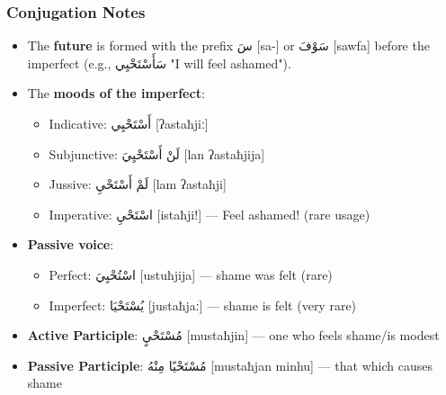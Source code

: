 \documentclass[letterpaper,12pt]{article}
\begin{document}
\subsubsection*{Conjugation Notes}
\begin{itemize}
  \item The \textbf{future} is formed with the prefix \textarabic{سَ} [sa-] or \textarabic{سَوْفَ} [sawfa] before the imperfect (e.g., \textarabic{سَأَسْتَحْيِي} "I will feel ashamed").
  \item The \textbf{moods of the imperfect}: 
    \begin{itemize}
      \item Indicative: \textarabic{أَسْتَحْيِي} [ʔastaħjiː] 
      \item Subjunctive: \textarabic{لَنْ أَسْتَحْيِيَ} [lan ʔastaħjija]
      \item Jussive: \textarabic{لَمْ أَسْتَحْيِ} [lam ʔastaħji]
      \item Imperative: \textarabic{اسْتَحْيِ} [istaħji!] — Feel ashamed! (rare usage)
    \end{itemize}
  \item \textbf{Passive voice}: 
    \begin{itemize}
      \item Perfect: \textarabic{اسْتُحْيِيَ} [ustuħjija] — shame was felt (rare)
      \item Imperfect: \textarabic{يُسْتَحْيَا} [justaħjaː] — shame is felt (very rare)
    \end{itemize}
  \item \textbf{Active Participle}: \textarabic{مُسْتَحْيٍ} [mustaħjin] — one who feels shame/is modest
  \item \textbf{Passive Participle}: \textarabic{مُسْتَحْيًا مِنْهُ} [mustaħjan minhu] — that which causes shame
\end{itemize}
\end{document}
